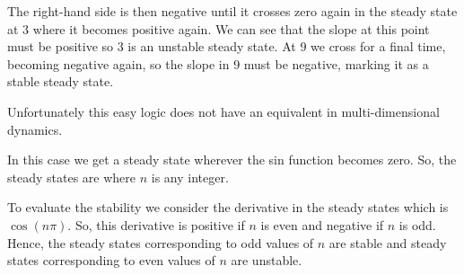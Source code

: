 The right-hand side is then negative until it crosses zero again in the steady state at 3 where it becomes positive again. We can see that the slope at this point must be positive so 3 is an unstable steady state. At 9 we cross for a final time, becoming negative again, so the slope in 9 must be negative, marking it as a stable steady state. 

Unfortunately this easy logic does not have an equivalent in multi-dimensional dynamics. 

\subquestion
{}

\solution
In this case we get a steady state wherever the sin function becomes zero. So, the steady states are
where $n$ is any integer. 

To evaluate the stability we consider the derivative in the steady states which is $\cos(n\pi)$. So, this derivative is positive if $n$ is even and negative if $n$ is odd. Hence, the steady states corresponding to odd values of $n$ are stable and steady states corresponding to even values of $n$ are unstable. 


